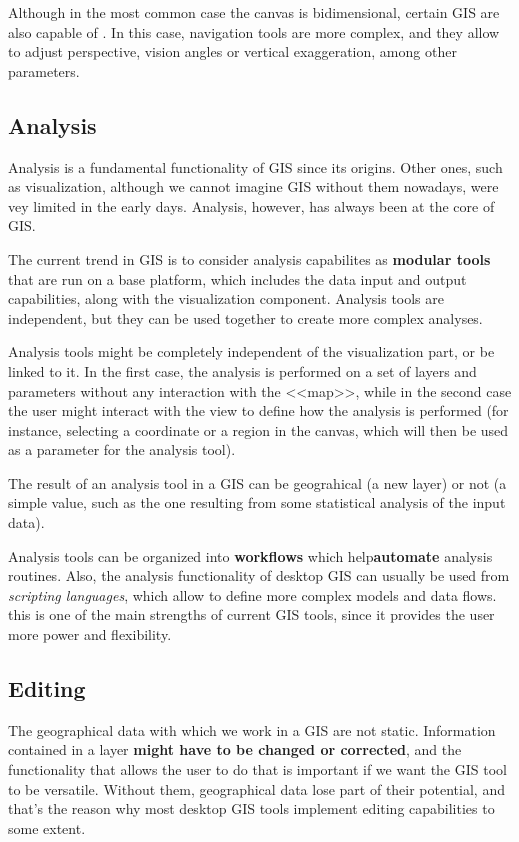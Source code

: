 Although in the most common case the canvas is bidimensional, certain GIS are also capable of . In this case, navigation tools are more complex, and they allow to adjust perspective, vision angles or vertical exaggeration, among other parameters.

\subsection{Analysis}

Analysis is a fundamental functionality of GIS since its origins. Other ones, such as visualization, although we cannot imagine GIS without them nowadays, were vey limited in the early days. Analysis, however, has always been at the core of GIS.

The current trend in GIS is to consider analysis capabilites as \textbf{modular tools} that are run on a base platform, which includes the data input and output capabilities, along with the visualization component. Analysis tools are independent, but they can be used together to create more complex analyses.

Analysis tools might be completely independent of the visualization part, or be linked to it. In the first case, the analysis is performed on a set of layers and parameters without any interaction with the <<map>>, while in the second case the user might interact with the view to define how the analysis is performed (for instance, selecting a coordinate or a region in the canvas, which will then be used as a parameter for the analysis tool).

The result of an analysis tool in a GIS can be geograhical (a new layer) or not (a simple value, such as the one resulting from some statistical analysis of the input data).

Analysis tools can be organized into \textbf{workflows} which help\textbf{automate} analysis routines. Also, the analysis functionality of desktop GIS can usually be used from \emph{scripting languages}, which allow to define more complex models and data flows. this is one of the main strengths of current GIS tools, since it provides the user more power and flexibility.

\subsection{Editing}

The geographical data with which we work in a GIS are not static. Information contained in a layer \textbf{might have to be changed or corrected}, and the functionality that allows the user to do that is important if we want the GIS tool to be versatile. Without them, geographical data lose part of their potential, and that's the reason why most desktop GIS tools implement editing capabilities to some extent.

